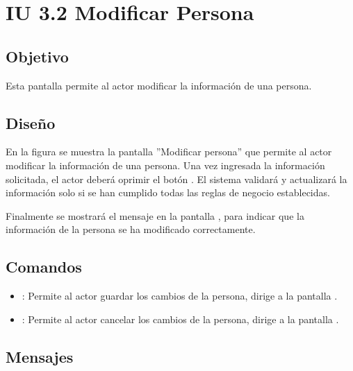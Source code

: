 \section{IU 3.2 Modificar Persona}

\subsection{Objetivo}
	Esta pantalla permite al actor modificar la información de una persona.
\subsection{Diseño}
	En la figura  se muestra la pantalla ''Modificar persona'' que permite al actor modificar la información de una persona.
	Una vez ingresada la información solicitada, el actor deberá oprimir el botón  . El sistema validará y actualizará la información solo si se han cumplido todas las reglas de negocio establecidas.
	
	Finalmente se mostrará el mensaje  en la pantalla , para indicar que la información de la persona se ha modificado correctamente.

\subsection{Comandos}
\begin{itemize}
	\item {}: Permite al actor guardar los cambios de la persona, dirige a la pantalla .
	\item {}: Permite al actor cancelar los cambios de la persona, dirige a la pantalla .
\end{itemize}

\subsection{Mensajes}

